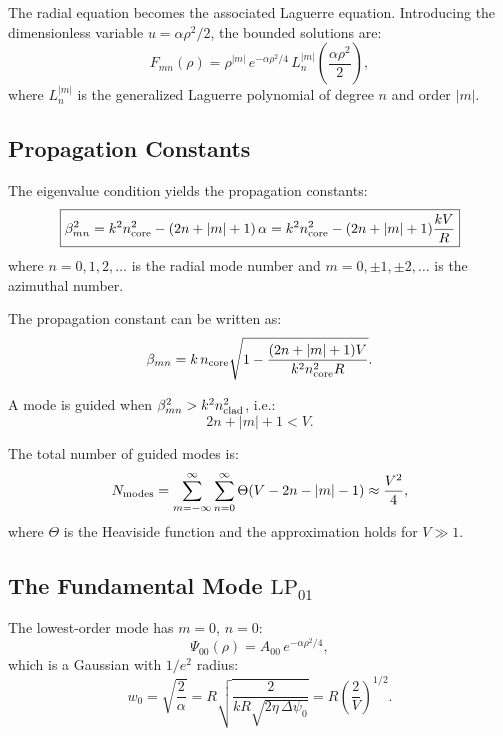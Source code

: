\documentclass[twocolumn,superscriptaddress,prd]{revtex4-2}
\begin{document}
The radial equation becomes the associated Laguerre equation.
Introducing the dimensionless variable $u = \alpha\rho^2/2$, the
bounded solutions are:
\begin{equation}
F_{mn}(\rho) = \rho^{|m|}\,e^{-\alpha\rho^2/4}\,L_n^{|m|}\!\left(\frac{\alpha\rho^2}{2}\right),
\label{eq:laguerre-modes}
\end{equation}
where $L_n^{|m|}$ is the generalized Laguerre polynomial of degree $n$
and order $|m|$.

\subsection{Propagation Constants}

The eigenvalue condition yields the propagation constants:
\begin{equation}
\boxed{
\beta_{mn}^2 = k^2 n_{\rm core}^2 - (2n + |m| + 1)\,\alpha
= k^2 n_{\rm core}^2 - (2n + |m| + 1)\frac{kV}{R}
}
\label{eq:beta-mn}
\end{equation}
where $n = 0, 1, 2, \ldots$ is the radial mode number and
$m = 0, \pm 1, \pm 2, \ldots$ is the azimuthal number.

The propagation constant can be written as:
\begin{equation}
\beta_{mn} = k\,n_{\rm core}\sqrt{1 - \frac{(2n + |m| + 1)V}{k^2 n_{\rm core}^2 R}}.
\label{eq:beta-explicit}
\end{equation}

A mode is guided when $\beta_{mn}^2 > k^2 n_{\rm clad}^2$, i.e.:
\begin{equation}
2n + |m| + 1 < V.
\label{eq:guidance-condition}
\end{equation}

The total number of guided modes is:
\begin{equation}
N_{\rm modes} = \sum_{m=-\infty}^{\infty}\sum_{n=0}^{\infty} \Theta\!\left(V - 2n - |m| - 1\right) \approx \frac{V^2}{4},
\label{eq:mode-count}
\end{equation}
where $\Theta$ is the Heaviside function and the approximation
holds for $V \gg 1$.

\subsection{The Fundamental Mode $\text{LP}_{01}$}

The lowest-order mode has $m = 0$, $n = 0$:
\begin{equation}
\Psi_{00}(\rho) = A_{00}\,e^{-\alpha\rho^2/4},
\label{eq:fundamental}
\end{equation}
which is a Gaussian with $1/e^2$ radius:
\begin{equation}
w_0 = \sqrt{\frac{2}{\alpha}} = R\sqrt{\frac{2}{kR\sqrt{2\eta\,\Delta\psi_0}}} = R\left(\frac{2}{V}\right)^{1/2}.
\label{eq:mode-radius}
\end{equation}
\end{document}
